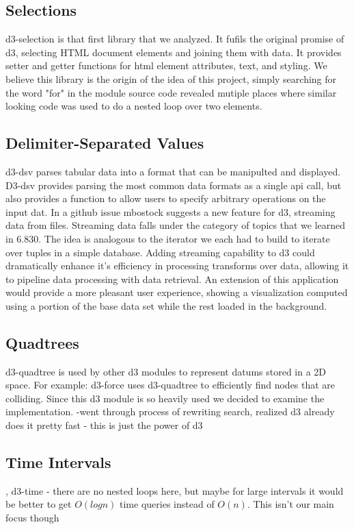 \documentclass[a4paper]{article}
\begin{document}
\subsection{Selections}
d3-selection is that first library that we analyzed. It fufils the original promise of d3, selecting HTML document elements and joining them with data. It provides setter and getter functions for html element attributes, text, and styling. We believe this library is the origin of the idea of this project, simply searching for the word "for" in the module source code revealed mutiple places where similar looking code was used to do a nested loop over two elements.

\subsection{Delimiter-Separated Values}
d3-dsv parses tabular data into a format that can be manipulted and displayed. D3-dsv provides parsing the most common data formats as a single api call, but also provides a function to allow users to specify arbitrary operations on the input dat. In a github issue mbostock suggests a new feature for d3, streaming data \cite{dsvstream} from files. Streaming data falls under the category of topics that we learned in 6.830. The idea is analogous to the iterator we each had to build to iterate over tuples in a simple database. Adding streaming capability to d3 could dramatically enhance it's efficiency in processing transforms over data, allowing it to pipeline data processing with data retrieval. An extension of this application would provide a more pleasant user experience, showing a visualization computed using a portion of the base data set while the rest loaded in the background.

\subsection{Quadtrees}
d3-quadtree is used by other d3 modules to represent datums stored in a 2D space. For example: d3-force uses d3-quadtree to efficiently find nodes that are colliding. Since this d3 module is so heavily used we decided to examine the implementation.
-went through process of rewriting search, realized d3 already does it pretty fast
- this is just the power of d3

\subsection{Time Intervals}, d3-time - there are no nested loops here, but maybe for large intervals it would be better to get $O(logn)$ time queries instead of $O(n)$. This isn't our main focus though
\end{document}
